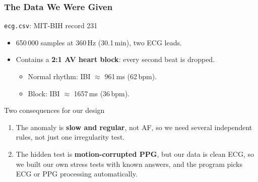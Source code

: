 \documentclass[t,aspectratio=169]{beamer}
\newcommand*\lev{\item[\color{red}\scalebox{0.9}{\textbullet}]}
\newcommand{\code}[1]{\texttt{#1}}
\begin{document}
\begin{frame}
\frametitle{The Data We Were Given}
\begin{block}{\code{ecg.csv}: MIT-BIH record 231}
\begin{itemize}
  \item 650\,000 samples at 360\,Hz (30.1\,min), two ECG leads.
  \item Contains a \textbf{2:1 AV heart block}: every second beat is dropped.
  \begin{itemize}
    \lev Normal rhythm: IBI $\approx$ 961\,ms (62\,bpm).
    \lev Block: IBI $\approx$ 1657\,ms (36\,bpm).
  \end{itemize}
\end{itemize}
\end{block}
\begin{exampleblock}{Two consequences for our design}
\begin{enumerate}
  \item The anomaly is \textbf{slow and regular}, not AF, so we need several independent rules, not just one
        irregularity test.
  \item The hidden test is \textbf{motion-corrupted PPG}, but our data is clean ECG, so we built our own stress tests
        with known answers, and the program picks ECG or PPG processing automatically.
\end{enumerate}
\end{exampleblock}
\end{frame}

\end{document}
